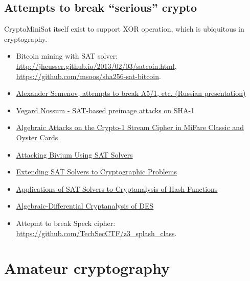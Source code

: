 \subsection{Attempts to break ``serious'' crypto}

CryptoMiniSat itself exist to support XOR operation, which is ubiquitous in cryptography.

\begin{itemize}
\item Bitcoin mining with SAT solver: \url{http://jheusser.github.io/2013/02/03/satcoin.html}, \url{https://github.com/msoos/sha256-sat-bitcoin}.

\item \href{http://2015.phdays.ru/program/dev/40400/}{Alexander Semenov, attempts to break A5/1, etc. (Russian presentation)}

\item \href{https://yurichev.com/mirrors/SAT_SMT_crypto/thesis-output.pdf}{Vegard Nossum - SAT-based preimage attacks on SHA-1}

\item \href{https://yurichev.com/mirrors/SAT_SMT_crypto/166.pdf}{Algebraic Attacks on the Crypto-1 Stream Cipher in MiFare Classic and Oyster Cards}

\item \href{https://yurichev.com/mirrors/SAT_SMT_crypto/Attacking-Bivium-Using-SAT-Solvers.pdf}{Attacking Bivium Using SAT Solvers}

\item \href{https://yurichev.com/mirrors/SAT_SMT_crypto/Extending_SAT_2009.pdf}{Extending SAT Solvers to Cryptographic Problems}

\item \href{https://yurichev.com/mirrors/SAT_SMT_crypto/sat-hash.pdf}{Applications of SAT Solvers to Cryptanalysis of Hash Functions}

\item \href{https://yurichev.com/mirrors/SAT_SMT_crypto/slidesC2DES.pdf}{Algebraic-Differential Cryptanalysis of DES}

\item Attepmt to break Speck cipher: \url{https://github.com/TechSecCTF/z3_splash_class}.
\end{itemize}

\section{Amateur cryptography}

